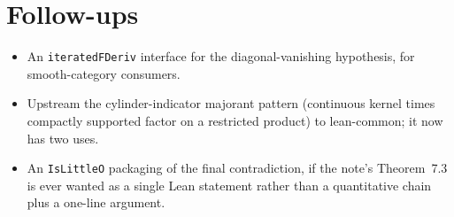 \documentclass[11pt]{article}
\begin{document}
\section{Follow-ups}

\begin{itemize}
\item An \texttt{iteratedFDeriv} interface for the diagonal-vanishing
hypothesis, for smooth-category consumers.
\item Upstream the cylinder-indicator majorant pattern (continuous kernel
times compactly supported factor on a restricted product) to lean-common;
it now has two uses.
\item An \texttt{IsLittleO} packaging of the final contradiction, if the
note's Theorem~7.3 is ever wanted as a single Lean statement rather than
a quantitative chain plus a one-line argument.
\end{itemize}
\end{document}
